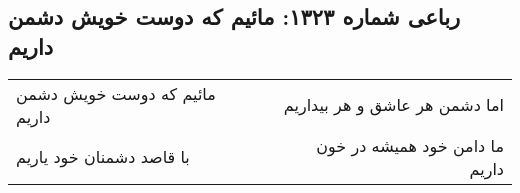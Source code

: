 \begin{center}
\section*{رباعی شماره ۱۳۲۳: مائیم که دوست خویش دشمن داریم}
\label{sec:1323}
\begin{longtable}{l p{0.5cm} r}
مائیم که دوست خویش دشمن داریم
&&
اما دشمن هر عاشق و هر بیداریم
\\
با قاصد دشمنان خود یاریم
&&
ما دامن خود همیشه در خون داریم
\\
\end{longtable}
\end{center}
